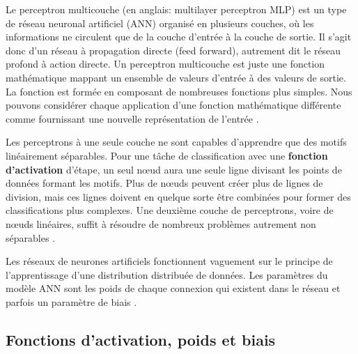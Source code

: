 	Le perceptron multicouche (en anglais: multilayer perceptron MLP) est un type de réseau neuronal artificiel (ANN) organisé en plusieurs couches, où les informations ne circulent que de la couche d'entrée à la couche de sortie. Il s'agit donc d'un réseau à propagation directe (feed forward), autrement dit le réseau profond à action directe. Un perceptron multicouche est juste une fonction mathématique mappant un ensemble de valeurs d'entrée à des valeurs de sortie. La fonction est formée en composant de nombreuses fonctions plus simples. Nous pouvons considérer chaque application d'une fonction mathématique différente comme fournissant une nouvelle représentation de l'entrée \cite{goodfellow2016deep,antoine2018apprentissage}.
	
	Les perceptrons à une seule couche ne sont capables d'apprendre que des motifs linéairement séparables. Pour une tâche de classification avec une \textbf{fonction d'activation} d'étape, un seul nœud aura une seule ligne divisant les points de données formant les motifs. Plus de nœuds peuvent créer plus de lignes de division, mais ces lignes doivent en quelque sorte être combinées pour former des classifications plus complexes. Une deuxième couche de perceptrons, voire de nœuds linéaires, suffit à résoudre de nombreux problèmes autrement non séparables \cite{antoine2018apprentissage}.
	
	Les réseaux de neurones artificiels fonctionnent vaguement sur le principe de l'apprentissage d'une distribution distribuée de données.
	Les paramètres du modèle ANN sont les poids de chaque connexion qui existent dans le réseau et parfois un paramètre de biais \cite{sarkar2017practical}.
	
	
	
	\subsection{Fonctions d'activation, poids et biais} \label{sec:activation_weight}
	
	
